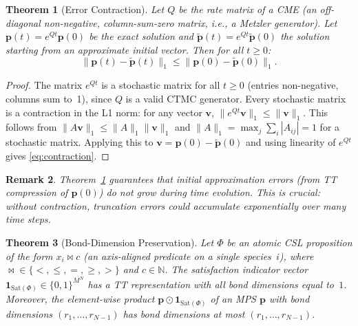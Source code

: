 \documentclass[11pt]{article}
\newtheorem{theorem}{Theorem}
\newtheorem{remark}[theorem]{Remark}
\newcommand{\norm}[1]{\lVert #1 \rVert}
\newcommand{\N}{\mathbb{N}}
\newcommand{\Sat}{\mathrm{Sat}}
\begin{document}
\begin{theorem}[Error Contraction]\label{thm:contraction}
Let $Q$ be the rate matrix of a CME (an off-diagonal non-negative,
column-sum-zero matrix, i.e., a Metzler generator).
Let $\mathbf{p}(t) = e^{Qt}\mathbf{p}(0)$ be the exact solution and
$\tilde{\mathbf{p}}(t) = e^{Qt}\tilde{\mathbf{p}}(0)$ the solution
starting from an approximate initial vector.
Then for all $t \geq 0$:
\begin{equation}\label{eq:contraction}
  \norm{\mathbf{p}(t) - \tilde{\mathbf{p}}(t)}_1
  \leq \norm{\mathbf{p}(0) - \tilde{\mathbf{p}}(0)}_1.
\end{equation}
\end{theorem}

\begin{proof}
The matrix $e^{Qt}$ is a stochastic matrix for all $t \geq 0$
(entries non-negative, columns sum to~1), since $Q$ is a valid
CTMC generator.
Every stochastic matrix is a contraction in the L1 norm:
for any vector $\mathbf{v}$,
$\norm{e^{Qt}\mathbf{v}}_1 \leq \norm{\mathbf{v}}_1$.
This follows from $\norm{A\mathbf{v}}_1 \leq \norm{A}_1 \norm{\mathbf{v}}_1$
and $\norm{A}_1 = \max_j \sum_i |A_{ij}| = 1$ for a stochastic matrix.
Applying this to $\mathbf{v} = \mathbf{p}(0) - \tilde{\mathbf{p}}(0)$
and using linearity of $e^{Qt}$ gives \eqref{eq:contraction}.
\end{proof}

\begin{remark}
Theorem~\ref{thm:contraction} guarantees that initial approximation
errors (from TT compression of $\mathbf{p}(0)$) do not grow during
time evolution.
This is crucial: without contraction, truncation errors could
accumulate exponentially over many time steps.
\end{remark}

\begin{theorem}[Bond-Dimension Preservation]\label{thm:bond-preservation}
Let $\Phi$ be an atomic CSL proposition of the form $x_i \bowtie c$
(an axis-aligned predicate on a single species~$i$), where
${\bowtie} \in \{<,\leq,=,\geq,>\}$ and $c \in \N$.
The satisfaction indicator vector
$\mathbf{1}_{\Sat(\Phi)} \in \{0,1\}^{M^N}$
has a TT representation with all bond dimensions equal to~$1$.
Moreover, the element-wise product
$\mathbf{p} \odot \mathbf{1}_{\Sat(\Phi)}$ of an MPS
$\mathbf{p}$ with bond dimensions $(r_1, \ldots, r_{N-1})$
has bond dimensions at most $(r_1, \ldots, r_{N-1})$.
\end{theorem}
\end{document}

